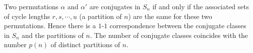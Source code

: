Two permutations $\alpha$ and $\alpha'$ are conjugates in $S_n$ if and only if the associated sets of cycle lengths $r, s, \cdots, u$ (a partition of $n$) are the same for these two permutations. Hence there is a $1$-$1$ correspondence between the conjugate classes in $S_n$ and the partitions of $n$. The number of conjugate classes coincides with the number $p(n)$ of distinct partitions of $n$.
